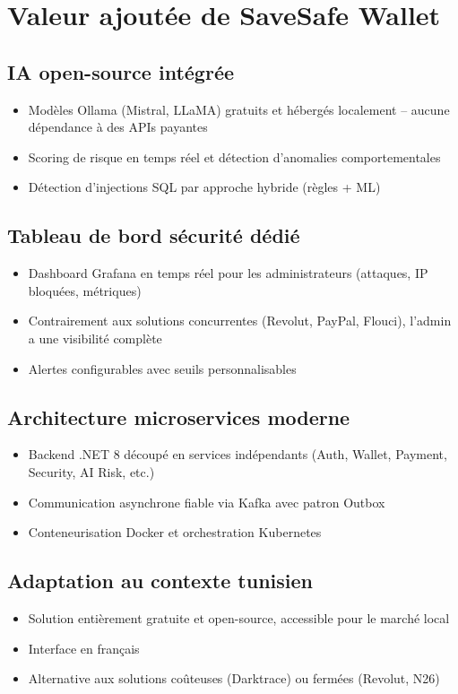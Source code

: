\documentclass[12pt,a4paper]{report}
\begin{document}
\section{Valeur ajoutée de SaveSafe Wallet}

\subsection*{IA open-source intégrée}
\begin{itemize}[leftmargin=*,label=--]
\item Modèles Ollama (Mistral, LLaMA) gratuits et hébergés localement -- aucune dépendance à des APIs payantes
\item Scoring de risque en temps réel et détection d'anomalies comportementales
\item Détection d'injections SQL par approche hybride (règles + ML)
\end{itemize}

\subsection*{Tableau de bord sécurité dédié}
\begin{itemize}[leftmargin=*,label=--]
\item Dashboard Grafana en temps réel pour les administrateurs (attaques, IP bloquées, métriques)
\item Contrairement aux solutions concurrentes (Revolut, PayPal, Flouci), l'admin a une visibilité complète
\item Alertes configurables avec seuils personnalisables
\end{itemize}

\subsection*{Architecture microservices moderne}
\begin{itemize}[leftmargin=*,label=--]
\item Backend .NET 8 découpé en services indépendants (Auth, Wallet, Payment, Security, AI Risk, etc.)
\item Communication asynchrone fiable via Kafka avec patron Outbox
\item Conteneurisation Docker et orchestration Kubernetes
\end{itemize}

\subsection*{Adaptation au contexte tunisien}
\begin{itemize}[leftmargin=*,label=--]
\item Solution entièrement gratuite et open-source, accessible pour le marché local
\item Interface en français
\item Alternative aux solutions coûteuses (Darktrace) ou fermées (Revolut, N26)
\end{itemize}
\end{document}
